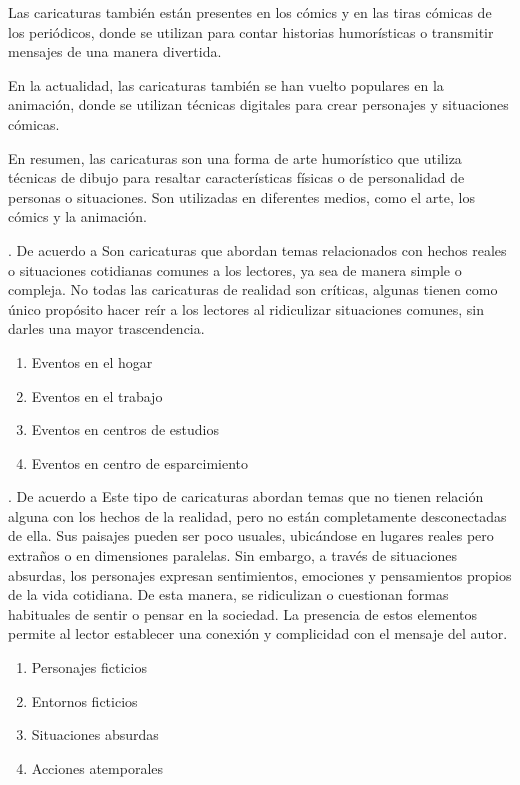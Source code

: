 \documentclass[12pt,a4paper]{article}
\begin{document}
Las caricaturas también están presentes en los cómics y en las tiras cómicas de los periódicos, donde se utilizan para contar historias humorísticas o transmitir mensajes de una manera divertida.

En la actualidad, las caricaturas también se han vuelto populares en la animación, donde se utilizan técnicas digitales para crear personajes y situaciones cómicas.

En resumen, las caricaturas son una forma de arte humorístico que utiliza técnicas de dibujo para resaltar características físicas o de personalidad de personas o situaciones. Son utilizadas en diferentes medios, como el arte, los cómics y la animación.

\noindent\textbf{\dimi}. De acuerdo a \cite{lenguaje} 
Son caricaturas que abordan temas relacionados con hechos reales o situaciones cotidianas comunes a los lectores, ya sea de manera simple o compleja. No todas las caricaturas de realidad son críticas, algunas tienen como único propósito hacer reír a los lectores al ridiculizar situaciones comunes, sin darles una mayor trascendencia.
\begin{enumerate}
\item  Eventos en el hogar
\item  Eventos en el trabajo
\item  Eventos  en centros de estudios
\item  Eventos en centro de esparcimiento
\end{enumerate}




\noindent\textbf{\dimii}.	De acuerdo a \cite{lenguaje} Este tipo de caricaturas abordan temas que no tienen relación alguna con los hechos de la realidad, pero no están completamente desconectadas de ella. Sus paisajes pueden ser poco usuales, ubicándose en lugares reales pero extraños o en dimensiones paralelas. Sin embargo, a través de situaciones absurdas, los personajes expresan sentimientos, emociones y pensamientos propios de la vida cotidiana. De esta manera, se ridiculizan o cuestionan formas habituales de sentir o pensar en la sociedad. La presencia de estos elementos permite al lector establecer una conexión y complicidad con el mensaje del autor.
\begin{enumerate}
	\item  Personajes ficticios
	\item Entornos ficticios
	\item  Situaciones absurdas
	\item  Acciones atemporales
\end{enumerate}
\end{document}

